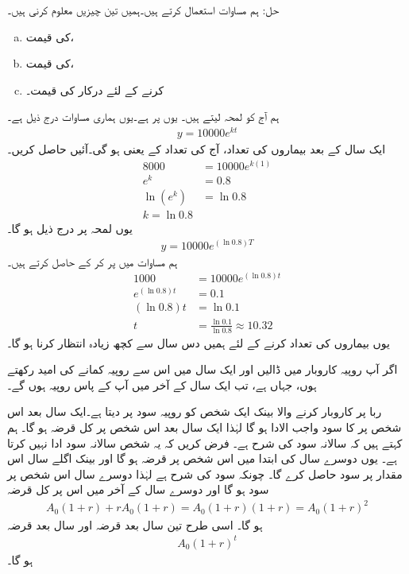 حل:\quad
ہم مساوات  استعمال کرتے ہیں۔ہمیں تین چیزیں معلوم کرنی ہیں۔
\begin{enumerate}[a.]
\item
{} کی قیمت،
\item
{} کی قیمت،
\item
{} کرنے کے لئے درکار  کی قیمت۔
\end{enumerate}
\quad {}\quad
ہم آج کو لمحہ  لیتے ہیں۔ یوں  پر  ہے۔یوں ہماری مساوات درج ذیل ہے۔
\begin{align*}
y=\num{10000}e^{kt}
\end{align*}
\quad {}\quad
ایک سال کے بعد بیماروں کی تعداد، آج کی تعداد کے   یعنی  ہو گی۔آئیں  حاصل کریں۔
\begin{align*}
8000&=\num{10000}e^{k(1)}\\
e^k&=0.8\\
\ln(e^k)&=\ln 0.8\\
k=\ln 0.8
\end{align*} 
یوں لمحہ  پر درج ذیل ہو گا۔
\begin{align}\label{مساوات_ماورائی_مثال_بیماری}
y=\num{10000}e^{(\ln 0.8)T}
\end{align}
\quad {}\quad
ہم مساوات  میں  پر کر کے  حاصل کرتے ہیں۔
\begin{align*}
1000&=\num{10000}e^{(\ln 0.8)t}\\
e^{(\ln 0.8)t}&=0.1\\
(\ln 0.8)t&=\ln 0.1\\
t&=\frac{\ln 0.1}{\ln 0.8}\approx 10.32
\end{align*}
یوں بیماروں کی تعداد  کرنے کے لئے ہمیں دس سال سے کچھ زیادہ انتظار کرنا ہو گا۔

اگر آپ  روپیہ کاروبار میں ڈالیں اور ایک سال میں اس سے  روپیہ کمانے کی امید رکھتے ہوں، جہاں  ہے، تب ایک سال کے آخر میں آپ کے پاس  روپیہ ہوں گے۔ 

ربا پر کاروبار کرنے والا بینک ایک شخص کو  روپیہ سود پر دیتا ہے۔ایک سال بعد اس شخص پر  کا سود واجب الادا ہو گا لہٰذا ایک سال بعد  اس شخص پر کل  قرضہ ہو گا۔ ہم کہتے ہیں کہ سالانہ سود کی شرح  ہے۔ فرض کریں کہ یہ شخص سالانہ سود ادا نہیں کرتا ہے۔ یوں دوسرے سال کی ابتدا میں اس شخص پر  قرضہ ہو گا اور بینک اگلے سال اس مقدار پر سود حاصل کرے گا۔ چونکہ سود کی شرح  ہے لہٰذا دوسرے سال اس شخص پر سود  ہو گا اور دوسرے سال کے آخر میں اس پر کل قرضہ
\begin{align*}
A_0(1+r)+rA_0(1+r)=A_0(1+r)(1+r)=A_0(1+r)^2
\end{align*}
 ہو گا۔ اسی طرح تین سال بعد قرضہ  اور   سال بعد قرضہ
\begin{align*}
A_0(1+r)^t
\end{align*}
ہو گا۔

